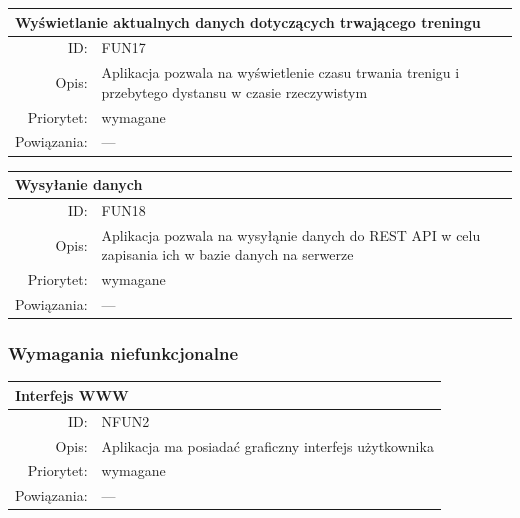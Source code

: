 \begin{center}
      \begin{tabular}{rp{10cm}}
	      \multicolumn{2}{l}{\textbf{Wyświetlanie aktualnych danych dotyczących trwającego treningu}} \\
	      \hline
	      ID: & FUN17 \\
	      Opis: & Aplikacja pozwala na wyświetlenie czasu trwania trenigu i przebytego dystansu w czasie rzeczywistym \\
	      Priorytet: & wymagane \\
	      Powiązania: & --- \\
    \end{tabular}
\end{center}

\begin{center}
      \begin{tabular}{rp{10cm}}
	      \multicolumn{2}{l}{\textbf{Wysyłanie danych}} \\
	      \hline
	      ID: & FUN18 \\
	      Opis: & Aplikacja pozwala na wysyłąnie danych do REST API w celu zapisania ich w bazie danych na serwerze \\
	      Priorytet: & wymagane \\
	      Powiązania: & --- \\
    \end{tabular}
\end{center}

\subsubsection{Wymagania niefunkcjonalne}
 \begin{center}
    \begin{tabular}{rp{10cm}}
      \multicolumn{2}{l}{\textbf{Interfejs WWW}} \\
      \hline
      ID: & NFUN2 \\
      Opis: & Aplikacja ma posiadać graficzny interfejs użytkownika \\
      Priorytet: & wymagane \\
      Powiązania: & --- \\
    \end{tabular}
    \end{center}

